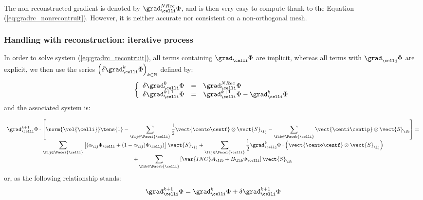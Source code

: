 \begin{remark}
The non-reconstructed gradient is denoted by $ \grad_\celli^{NRec} \Phi  $, and is then 
very easy to compute thank to the Equation (\ref{eq:gradrc_nonrecontruit}).
However, it is neither accurate nor consistent on a non-orthogonal mesh.
\end{remark}

\subsubsection{Handling with reconstruction: iterative process}

In order to solve system (\ref{eq:gradrc_recontruit}), all terms containing $\grad_\celli \Phi$ are implicit, whereas 
all terms with $\grad_\cellj \Phi$ are explicit, we then use the series $\left( \delta \grad_\celli^k \Phi \right)_{k \in \mathbb{N}}$ defined by:
%
\begin{equation}
\left\{\begin{array}{r c l}
\delta \grad_\celli^0 \Phi &=& \grad_\celli^{NRec} \Phi \\
\delta \grad_\celli^{k+1} \Phi &= &\grad_\celli^{k+1} \Phi - \grad_\celli^k \Phi
\end{array}\right.
\end{equation}
%
and the associated system is:

\begin{equation}\label{eq:gradrc_recontruit_comp2}
\begin{array}{c}
\displaystyle
\grad_{\celli}^{k+1} \Phi \cdot \left[\norm{\vol{\celli}} \tens{1} - 
\sum\limits_{ \fij \in \Facei{\celli}} \frac{1}{2}  \vect{\cento \centf} \otimes \vect{S}_{\ij} -
\sum\limits_{ \fib \in \Faceb{\celli}}  \vect{\centi \centip}  \otimes \vect{S}_{\ib}  \right]
= \\
\displaystyle
\sum\limits_{\fij \in \Facei{\celli}}\left[
(\alpha_{\ij} \Phi_\celli + (1 - \alpha_{\ij}) \Phi_\cellj)\right] \vect{S}_{\ij}+
\sum\limits_{\fij \in \Facei{\celli}} \frac{1}{2} \grad_\cellj^k \Phi \cdot \left( \vect{\cento \centf} \otimes \vect{S}_{\ij} \right) \\
\displaystyle +
\sum\limits_{\fib \in \Faceb{\celli}}\left[ \var{INC} A_{\fib} + B_{\fib} \Phi_\celli \right] \vect{S}_{\ib}
\end{array}
\end{equation}
%
or, as the following relationship stands:
\begin{equation*}
 \grad_\celli^{k+1} \Phi = \grad_\celli^k \Phi+ \delta \grad_\celli^{k+1} \Phi
\end{equation*}

